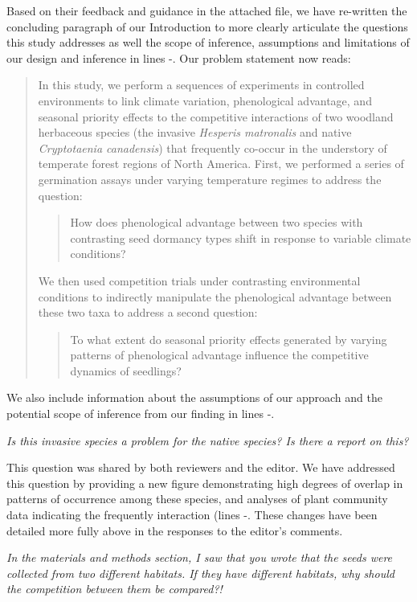 \documentclass[11pt]{article}
\begin{document}
Based on their feedback and guidance in the attached file, we have re-written the concluding paragraph of our Introduction to more clearly articulate the questions this study addresses as well the scope of inference, assumptions and limitations of our design and inference in lines -. Our problem statement now reads:
\begin{quote}
In this study, we perform a sequences of experiments in controlled environments to link climate variation, phenological advantage, and seasonal priority effects to the competitive interactions of two woodland herbaceous species (the invasive \textit{Hesperis matronalis} and native \textit{Cryptotaenia canadensis}) that frequently co-occur in the understory of temperate forest regions of North America. First, we performed a series of germination assays under varying temperature regimes to address the question: 
\begin{quote}How does phenological advantage between two species with contrasting seed dormancy types shift in response to variable climate conditions?\end{quote}
We then used competition trials under contrasting environmental conditions to indirectly manipulate the phenological advantage between these two taxa to address a second question: \begin{quote}To what extent do seasonal priority effects generated by varying patterns of phenological advantage influence the competitive dynamics of seedlings?\end{quote}
\end{quote}

We also include information about the assumptions of our approach and the potential scope of inference from our finding in lines -. 

\emph{Is this invasive species a problem for the native species? Is there a report on this?}

This question was shared by both reviewers and the editor. We have addressed this question by providing a new figure demonstrating high degrees of overlap in patterns of occurrence among these species, and analyses of plant community data indicating the frequently interaction (lines -. These changes have been detailed more fully above in the responses to the editor's comments.

\emph{In the materials and methods section, I saw that you wrote that the seeds were collected from two different habitats. If they have different habitats, why should the competition between them be compared?!}
\end{document}
